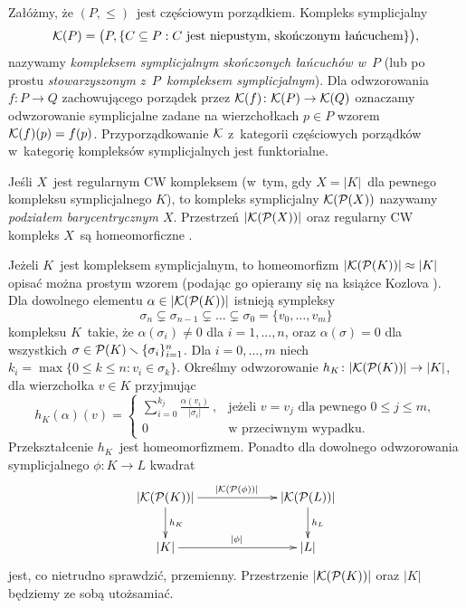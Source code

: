 Załóżmy, że $(P,\leq)$~jest częściowym porządkiem. Kompleks symplicjalny \[\mathcal{K}(P)=\bigl(P,\{C\subseteq P:C\text{ jest niepustym, skończonym łańcuchem}\}\bigr),\] nazywamy \textit{kompleksem symplicjalnym skończonych łańcuchów w~$P$} (lub po prostu \textit{stowarzyszonym z~$P$~kompleksem symplicjalnym}). Dla odwzorowania $f\colon P\to Q$ zachowującego porządek przez $\mathcal{K}(f)\colon \mathcal{K}(P)\to \mathcal{K}(Q)$ oznaczamy odwzorowanie symplicjalne zadane na wierzchołkach $p\in P$ wzorem $\mathcal{K}(f)(p)=f(p)$. Przyporządkowanie $\mathcal{K}$ z~kategorii częściowych porządków w~kategorię kompleksów symplicjalnych jest funktorialne.

Jeśli $X$~jest regularnym CW kompleksem (w~tym, gdy $X=|K|$~dla pewnego kompleksu symplicjalnego $K$), to kompleks symplicjalny $\mathcal{K}(\mathcal{P}(X))$ nazywamy \textit{podziałem barycentrycznym $X$}. Przestrzeń $|\mathcal{K}(\mathcal{P}(X))|$ oraz regularny CW kompleks $X$~są homeomorficzne \cite[Proposition 5.3.8]{Geoghegan08}. 

Jeżeli $K$~jest kompleksem symplicjalnym, to homeomorfizm $|\mathcal{K}(\mathcal{P}(K))|\approx |K|$ opisać można prostym wzorem (podając go opieramy się na książce Kozlova \cite{Kozlov08}). Dla dowolnego elementu $\alpha\in |\mathcal{K}(\mathcal{P}(K))|$ istnieją sympleksy \[\sigma_n\subsetneq \sigma_{n-1}\subsetneq \ldots \subsetneq \sigma_0=\{v_0,\ldots,v_m\}\] kompleksu $K$~takie, że $\alpha(\sigma_i)\not=0$ dla $i=1,\ldots,n$, oraz $\alpha(\sigma)=0$ dla wszystkich $\sigma\in \mathcal{P}(K)\smallsetminus\{\sigma_i\}_{i=1}^{n}$.  Dla $i=0,\ldots,m$ niech $k_i=\max\{0\leq k\leq n: v_i\in \sigma_k\}$. Określmy odwzorowanie $h_K\colon |\mathcal{K}(\mathcal{P}(K))|\to |K|$, dla wierzchołka $v\in K$ przyjmując \[h_K(\alpha)(v)=\begin{cases}\sum_{i=0}^{k_j}\frac{\alpha(v_i)}{|\sigma_i|}\ , & \text{jeżeli } v=v_j \text{ dla pewnego } 0\leq j\leq m,\\
0 & \text{w przeciwnym wypadku.}\end{cases}\]
Przekształcenie $h_K$~jest homeomorfizmem. Ponadto dla dowolnego odwzorowania symplicjalnego $\phi\colon K\to L$ kwadrat
\begin{equation}\xymatrix@C=2.2cm{|\mK(\mP(K))|\ar[d]^{h_K}\ar[r]^{|\mK(\mP(\phi))|} & |\mK(\mP(L))|\ar[d]^{h_L}\\ |K|\ar[r]^{|\phi|} & |L|}\label{kwadrat_o_realizacji_geom}\end{equation}
jest, co nietrudno sprawdzić, przemienny. Przestrzenie $|\mathcal{K}(\mathcal{P}(K))|$ oraz $|K|$ będziemy ze sobą utożsamiać.

